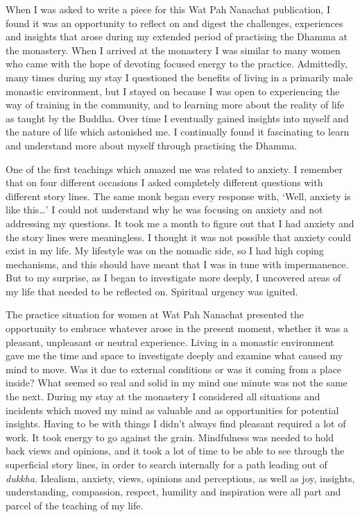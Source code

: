 
When I was asked to write a piece for this Wat Pah Nanachat publication, 
I found it was an opportunity to reflect on and digest the challenges, 
experiences and insights that arose during my extended period of
practising the Dhamma at the monastery. When I arrived at the monastery
I was similar to many women who came with the hope of devoting focused
energy to the practice. Admittedly, many times during my stay I
questioned the benefits of living in a primarily male monastic
environment, but I stayed on because I was open to experiencing the way
of training in the community, and to learning more about the reality of
life as taught by the Buddha. Over time I eventually gained insights
into myself and the nature of life which astonished me. I continually
found it fascinating to learn and understand more about myself through
practising the Dhamma. 

One of the first teachings which amazed me was related to anxiety. I
remember that on four different occasions I asked completely different
questions with different story lines. The same monk began every response
with, `Well, anxiety is like this\ldots{}' I could not understand why he
was focusing on anxiety and not addressing my questions. It took me a
month to figure out that I had anxiety and the story lines were
meaningless. I thought it was not possible that anxiety could exist in
my life. My lifestyle was on the nomadic side, so I had high coping
mechanisms, and this should have meant that I was in tune with
impermanence. But to my surprise, as I began to investigate more deeply, 
I uncovered areas of my life that needed to be reflected on. Spiritual
urgency was ignited. 

The practice situation for women at Wat Pah Nanachat presented the
opportunity to embrace whatever arose in the present moment, whether it
was a pleasant, unpleasant or neutral experience. Living in a monastic
environment gave me the time and space to investigate deeply and examine
what caused my mind to move. Was it due to external conditions or was it
coming from a place inside? What seemed so real and solid in my mind one
minute was not the same the next. During my stay at the monastery I
considered all situations and incidents which moved my mind as valuable
and as opportunities for potential insights. Having to be with things I
didn't always find pleasant required a lot of work. It took energy to go
against the grain. Mindfulness was needed to hold back views and
opinions, and it took a lot of time to be able to see through the
superficial story lines, in order to search internally for a path
leading out of \emph{dukkha}. Idealism, anxiety, views, opinions and
perceptions, as well as joy, insights, understanding, compassion, 
respect, humility and inspiration were all part and parcel of the
teaching of my life. 

